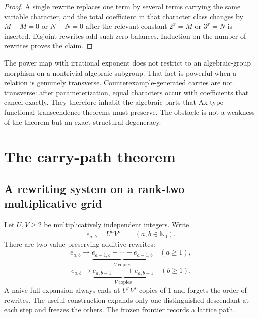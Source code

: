 \documentclass[11pt,oneside]{article}
\theoremstyle{definition}
\newcommand{\N}{\mathbb{N}}
\begin{document}
\begin{proof}
A single rewrite replaces one term by several terms carrying the same variable character, and the total coefficient in that character class changes by
$M-M=0$ or $N-N=0$ after the relevant constant $2^x=M$ or $3^x=N$ is inserted.  Disjoint rewrites add such zero balances.  Induction on the number of rewrites proves the claim.
\end{proof}

\begin{roadblockbox}
The power map with irrational exponent does not restrict to an algebraic-group morphism on a nontrivial algebraic subgroup.  That fact is powerful when a relation is genuinely transverse.  Counterexample-generated carries are not transverse: after parameterization, equal characters occur with coefficients that cancel exactly.  They therefore inhabit the algebraic parts that Ax-type functional-transcendence theorems must preserve.  The obstacle is not a weakness of the theorem but an exact structural degeneracy.
\end{roadblockbox}

\section{The carry-path theorem}

\subsection{A rewriting system on a rank-two multiplicative grid}

Let $U,V\ge2$ be multiplicatively independent integers.  Write
\[
       e_{a,b}=U^aV^b\qquad(a,b\in\N_0).
\]
There are two value-preserving additive rewrites:
\begin{equation}\label{eq:abstractrewrites}
  e_{a,b}\longrightarrow
     \underbrace{e_{a-1,b}+\cdots+e_{a-1,b}}_{U\ \mathrm{copies}}
     \quad(a\ge1),
\end{equation}
\begin{equation}\label{eq:abstractrewrites2}
  e_{a,b}\longrightarrow
     \underbrace{e_{a,b-1}+\cdots+e_{a,b-1}}_{V\ \mathrm{copies}}
     \quad(b\ge1).
\end{equation}
A naive full expansion always ends at $U^rV^s$ copies of $1$ and forgets the order of rewrites.  The useful construction expands only one distinguished descendant at each step and freezes the others.  The frozen frontier records a lattice path.
\end{document}
